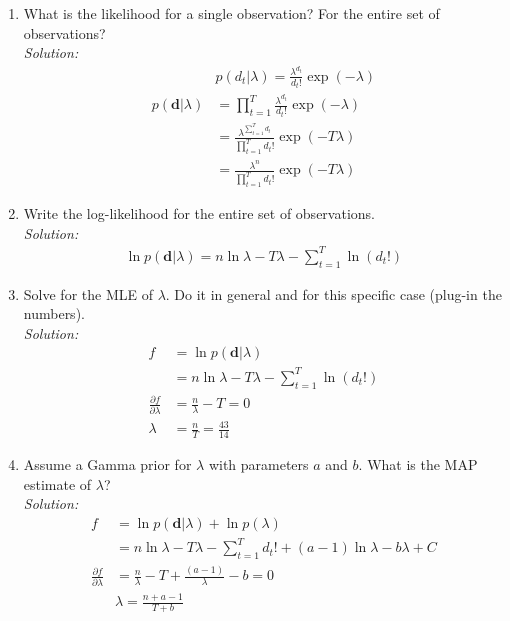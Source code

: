 \documentclass[12pt,a4paper]{article}
\begin{document}
\begin{enumerate}
  \item What is the likelihood for a single observation?  For the entire set of observations? \\
	  \emph{Solution:} \\
		  \begin{align*}
		  	&p(d_t\vert \lambda) = \frac{\lambda^{d_t}}{d_t!}\exp(-\lambda) \\
		  	p(\textbf{d} \vert \lambda)&=\prod_{t=1}^{T} \frac{\lambda^{d_t}}{d_t!}\exp(-\lambda) \\
		  	&=\frac{\lambda^{\sum_{t=1}^{T}d_t}}{\prod_{t=1}^{T}d_t!}\exp(-T\lambda) \\
		  	&=\frac{\lambda^{n}}{\prod_{t=1}^{T}d_t!}\exp(-T\lambda)
		  \end{align*}
  
  \item Write the log-likelihood for the entire set of observations. \\
	  \emph{Solution:} \\
		  \begin{align*}
		  	\ln p(\textbf{d}\vert\lambda) = n\ln\lambda - T \lambda - \sum_{t=1}^{T}\ln(d_t!)
		  \end{align*}
  
   
  \item Solve for the MLE of $\lambda$.  Do it in general and for this specific case (plug-in the numbers). \\
	  \emph{Solution:} \\
		  \begin{align*}
		  	f &= \ln p(\textbf{d} \vert \lambda)\\ 
		  	&= n \ln\lambda - T\lambda- \sum_{t=1}^{T}\ln(d_t!) \\
		  	\frac{\partial f}{\partial \lambda} &= \frac{n}{\lambda} - T = 0 \\
		  	\lambda &= \frac{n}{T} = \frac{43}{14}
		  \end{align*}
  
  \item Assume a Gamma prior for $\lambda$ with parameters $a$ and $b$.  What is the MAP estimate of $\lambda$? \\
	  \emph{Solution:} \\
		  \begin{align*}
		  	f &= \ln p(\textbf{d} \vert \lambda)+\ln p(\lambda) \\
		  	&= n \ln \lambda - T\lambda - \sum_{t=1}^{T}d_t! + (a-1)\ln\lambda-b\lambda + C \\ 
		  	\frac{\partial f}{\partial \lambda} &= \frac{n}{\lambda} - T + \frac{(a - 1)}{\lambda} - b = 0 \\
		  	&\lambda = \frac{n + a -1}{T + b}\\
		  \end{align*}
  

\end{enumerate}
\end{document}
